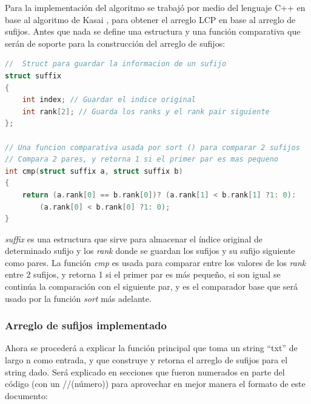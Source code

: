 Para la implementación del algoritmo se trabajó por medio del lenguaje C++ en base al algoritmo de Kasai \cite{kasaimethod}, \cite{kasai} para obtener el arreglo LCP en base al arreglo de sufijos. Antes que nada se define una estructura y una función comparativa que serán de soporte para la construcción del arreglo de sufijos:

\begin{lstlisting}[language=C++, caption=Definición previa de estructuras para construir el arreglo de sufijos.]
//  Struct para guardar la informacion de un sufijo
struct suffix
{
	int index; // Guardar el indice original
	int rank[2]; // Guarda los ranks y el rank pair siguiente
};

// Una funcion comparativa usada por sort () para comparar 2 sufijos
// Compara 2 pares, y retorna 1 si el primer par es mas pequeno
int cmp(struct suffix a, struct suffix b)
{
	return (a.rank[0] == b.rank[0])? (a.rank[1] < b.rank[1] ?1: 0):
		(a.rank[0] < b.rank[0] ?1: 0);
}
\end{lstlisting}

\textit{suffix} es una estructura que sirve para almacenar el índice original de determinado sufijo y los \textit{rank} donde se guardan los sufijos y su sufijo siguiente como pares. La función \textit{cmp} es usada para comparar entre los valores de los \textit{rank} entre 2 sufijos, y retorna 1 si el primer par es más pequeño, si son igual se continúa la comparación con el siguiente par, y es el comparador base que será usado por la función \textit{sort} más adelante.

\subsubsection{Arreglo de sufijos implementado}

Ahora se procederá a explicar la función principal que toma un string ``txt'' de largo n como entrada, y que construye y retorna el arreglo de sufijos para el string dado. Será explicado en secciones que fueron numerados en parte del código (con un //(número)) para aprovechar en mejor manera el formato de este documento:

